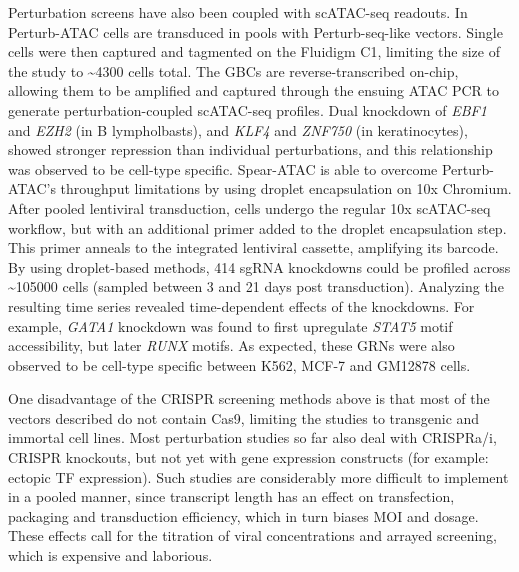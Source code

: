 Perturbation screens have also been coupled with scATAC-seq readouts. In Perturb-ATAC cells are transduced in pools with Perturb-seq-like vectors. Single cells were then captured and tagmented on the Fluidigm C1, limiting the size of the study to \textasciitilde\num{4300} cells total. The GBCs are reverse-transcribed on-chip, allowing them to be amplified and captured through the ensuing ATAC PCR to generate perturbation-coupled scATAC-seq profiles. Dual knockdown of \textit{EBF1} and \textit{EZH2} (in B lympholbasts), and \textit{KLF4} and \textit{ZNF750} (in keratinocytes), showed stronger repression than individual perturbations, and this relationship was observed to be cell-type specific. Spear-ATAC is able to overcome Perturb-ATAC's throughput limitations by using droplet encapsulation on 10x Chromium. After pooled lentiviral transduction, cells undergo the regular 10x scATAC-seq workflow, but with an additional primer added to the droplet encapsulation step. This primer anneals to the integrated lentiviral cassette, amplifying its barcode. By using droplet-based methods, \num{414} sgRNA knockdowns could be profiled across \textasciitilde\num{105000} cells (sampled between 3 and 21 days post transduction). Analyzing the resulting time series revealed time-dependent effects of the knockdowns. For example, \textit{GATA1} knockdown was found to first upregulate \textit{STAT5} motif accessibility, but later \textit{RUNX} motifs. As expected, these GRNs were also observed to be cell-type specific between K562, MCF-7 and GM12878 cells.


One disadvantage of the CRISPR screening methods above is that most of the vectors described do not contain Cas9, limiting the studies to transgenic and immortal cell lines. Most perturbation studies so far also deal with CRISPRa/i, CRISPR knockouts, but not yet with gene expression constructs (for example: ectopic TF expression). Such studies are considerably more difficult to implement in a pooled manner, since transcript length has an effect on transfection, packaging and transduction efficiency, which in turn biases MOI and dosage. These effects call for the titration of viral concentrations and arrayed screening, which is expensive and laborious.

